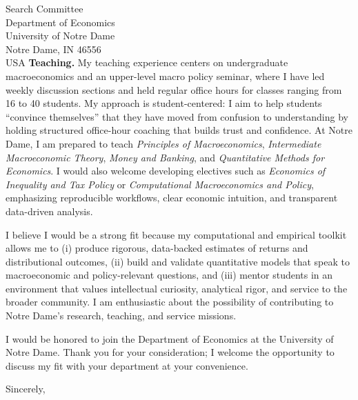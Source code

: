 \documentclass[11pt,letterpaper]{letter}
\begin{document}
\begin{letter}{Search Committee \\
Department of Economics \\
University of Notre Dame \\
Notre Dame, IN 46556 \\ USA}
\textbf{Teaching.} My teaching experience centers on undergraduate macroeconomics and an upper-level macro policy seminar, where I have led weekly discussion sections and held regular office hours for classes ranging from 16 to 40 students. My approach is student-centered: I aim to help students “convince themselves” that they have moved from confusion to understanding by holding structured office-hour coaching that builds trust and confidence. At Notre Dame, I am prepared to teach \textit{Principles of Macroeconomics}, \textit{Intermediate Macroeconomic Theory}, \textit{Money and Banking}, and \textit{Quantitative Methods for Economics}. I would also welcome developing electives such as \textit{Economics of Inequality and Tax Policy} or \textit{Computational Macroeconomics and Policy}, emphasizing reproducible workflows, clear economic intuition, and transparent data-driven analysis.

I believe I would be a strong fit because my computational and empirical toolkit allows me to (i) produce rigorous, data-backed estimates of returns and distributional outcomes, (ii) build and validate quantitative models that speak to macroeconomic and policy-relevant questions, and (iii) mentor students in an environment that values intellectual curiosity, analytical rigor, and service to the broader community. I am enthusiastic about the possibility of contributing to Notre Dame’s research, teaching, and service missions.

I would be honored to join the Department of Economics at the University of Notre Dame. Thank you for your consideration; I welcome the opportunity to discuss my fit with your department at your convenience.

\closing{Sincerely,}

\end{letter}
\end{document}
